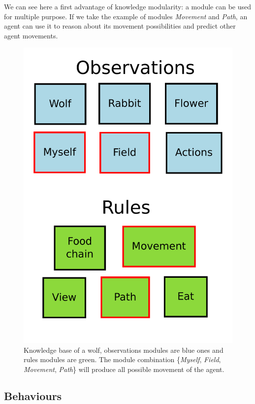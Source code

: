 \documentclass{aamas2012}
\begin{document}
	We can see here a first advantage of knowledge modularity: a module can be used for multiple purpose.
	If we take the example of modules \textit{Movement} and \textit{Path}, an agent can use it to reason about its movement possibilities and predict other agent movements.

	\begin{figure}
		\centering
		\includegraphics[keepaspectratio=true, scale=0.25]{module_combination.pdf}
		\caption
		{
			\label{module_combination}
			Knowledge base of a wolf, observations modules are blue ones and rules modules are green.
			The module combination \{\textit{Myself}, \textit{Field}, \textit{Movement}, \textit{Path}\} will produce all possible movement of the agent.
		}
	\end{figure}

\subsection{Behaviours}
\end{document}
